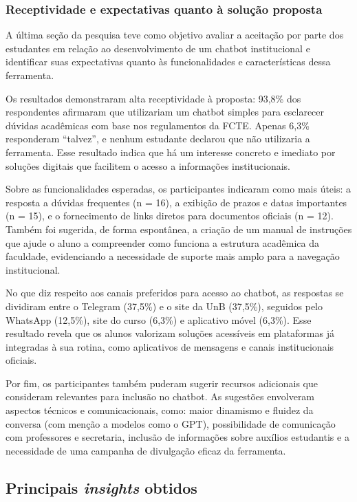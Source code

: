 \subsubsection{Receptividade e expectativas quanto à solução proposta}

A última seção da pesquisa teve como objetivo avaliar a aceitação por parte dos estudantes em relação ao desenvolvimento de um chatbot institucional e identificar suas expectativas quanto às funcionalidades e características dessa ferramenta.

Os resultados demonstraram alta receptividade à proposta: 93{,}8\% dos respondentes afirmaram que utilizariam um chatbot simples para esclarecer dúvidas acadêmicas com base nos regulamentos da FCTE. Apenas 6{,}3\% responderam “talvez”, e nenhum estudante declarou que não utilizaria a ferramenta. Esse resultado indica que há um interesse concreto e imediato por soluções digitais que facilitem o acesso a informações institucionais.

Sobre as funcionalidades esperadas, os participantes indicaram como mais úteis: a resposta a dúvidas frequentes (n = 16), a exibição de prazos e datas importantes (n = 15), e o fornecimento de links diretos para documentos oficiais (n = 12). Também foi sugerida, de forma espontânea, a criação de um manual de instruções que ajude o aluno a compreender como funciona a estrutura acadêmica da faculdade, evidenciando a necessidade de suporte mais amplo para a navegação institucional.

No que diz respeito aos canais preferidos para acesso ao chatbot, as respostas se dividiram entre o Telegram (37{,}5\%) e o site da UnB (37{,}5\%), seguidos pelo WhatsApp (12{,}5\%), site do curso (6{,}3\%) e aplicativo móvel (6{,}3\%). Esse resultado revela que os alunos valorizam soluções acessíveis em plataformas já integradas à sua rotina, como aplicativos de mensagens e canais institucionais oficiais.

Por fim, os participantes também puderam sugerir recursos adicionais que consideram relevantes para inclusão no chatbot. As sugestões envolveram aspectos técnicos e comunicacionais, como: maior dinamismo e fluidez da conversa (com menção a modelos como o GPT), possibilidade de comunicação com professores e secretaria, inclusão de informações sobre auxílios estudantis e a necessidade de uma campanha de divulgação eficaz da ferramenta.

\subsection{Principais \textit{insights} obtidos}

